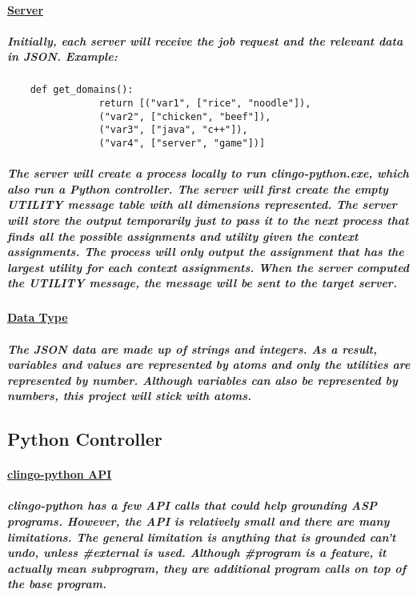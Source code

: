 \documentclass{article}
\begin{document}
	\paragraph{\underline{Server}}
	\subparagraph{Initially, each server will receive the job request and the relevant data in JSON. Example:}
	\begin{verbatim}
	def get_domains():
                return [("var1", ["rice", "noodle"]),
                ("var2", ["chicken", "beef"]),
                ("var3", ["java", "c++"]),
                ("var4", ["server", "game"])]
	\end{verbatim}
	\subparagraph{The server will create a process locally to run clingo-python.exe, which also run a Python controller. The server will first create the empty UTILITY message table with all dimensions represented. The server will store the output temporarily just to pass it to the next process that finds all the possible assignments and utility given the context assignments. The process will only output the assignment that has the largest utility for each context assignments. When the server computed the UTILITY message, the message will be sent to the target server.}
	\paragraph{\underline{Data Type}}
	\subparagraph{The JSON data are made up of strings and integers. As a result, variables and values are represented by atoms and only the utilities are represented by number. Although variables can also be represented by numbers, this project will stick with atoms.}
	\subsection{Python Controller}
	\paragraph{\underline{clingo-python API}}
	\subparagraph{clingo-python has a few API calls that could help grounding ASP programs. However, the API is relatively small and there are many limitations. The general limitation is anything that is grounded can't undo, unless \#external is used. Although \#program is a feature, it actually mean subprogram, they are additional program calls on top of the base program.}
\end{document}
